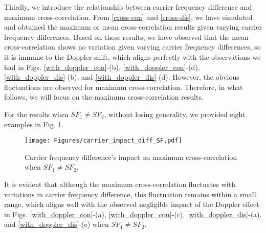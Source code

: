 \documentclass{IEEEtaes}
\theoremstyle{plain}
\begin{document}

Thirdly, we introduce the relationship between carrier frequency difference and maximum cross-correlation. From \eqref{cross-con} and \eqref{cross-dis}, we have simulated and obtained the maximum or mean cross-correlation results given varying carrier frequency differences. Based on these results, we have observed that the mean cross-correlation shows no variation given varying carrier frequency differences, so it is immune to the Doppler shift, which aligns perfectly with the observations we had in Figs. \ref{with_doppler_con}-(b), \ref{with_doppler_con}-(d), \ref{with_doppler_dis}-(b), and \ref{with_doppler_dis}-(d). However, the obvious fluctuations are observed for maximum cross-correlation. Therefore, in what follows, we will focus on the maximum cross-correlation results.

For the results when $SF_1 \neq SF_2$, without losing generality, we provided eight examples in Fig. \ref{carrier_impact_diff_SF}.
 \begin{figure}[ht]
  \centering
  \texttt{[image: Figures/carrier\_impact\_diff\_SF.pdf]}
  \caption{Carrier frequency difference’s impact on maximum cross-correlation when $SF_1 \neq SF_2$.}
  \label{carrier_impact_diff_SF}
\end{figure}
It is evident that although the maximum cross-correlation fluctuates with variations in carrier frequency difference, this fluctuation remains within a small range, which aligns well with the observed negligible impact of the Doppler effect in Figs. \ref{with_doppler_con}-(a), \ref{with_doppler_con}-(c), \ref{with_doppler_dis}-(a), and \ref{with_doppler_dis}-(c) when $SF_1 \neq SF_2$. 
\end{document}
